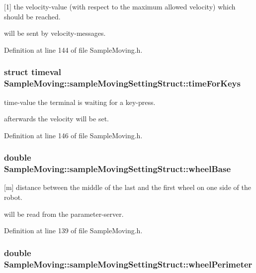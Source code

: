 \mbox{[}1\mbox{]} the velocity-\/value (with respect to the maximum allowed velocity) which should be reached. 

will be sent by velocity-\/messages. 

Definition at line 144 of file Sample\-Moving.\-h.

\hypertarget{structSampleMoving_1_1sampleMovingSettingStruct_a4d960897101facc5a4d0e0998d68728e}{
\subsubsection[{time\-For\-Keys}]{\setlength{\rightskip}{0pt plus 5cm}struct timeval Sample\-Moving\-::sample\-Moving\-Setting\-Struct\-::time\-For\-Keys}}\label{structSampleMoving_1_1sampleMovingSettingStruct_a4d960897101facc5a4d0e0998d68728e}


time-\/value the terminal is waiting for a key-\/press. 

afterwards the velocity will be set. 

Definition at line 146 of file Sample\-Moving.\-h.

\hypertarget{structSampleMoving_1_1sampleMovingSettingStruct_a9606973b8c9b90b8dc360855397505f9}{
\subsubsection[{wheel\-Base}]{\setlength{\rightskip}{0pt plus 5cm}double Sample\-Moving\-::sample\-Moving\-Setting\-Struct\-::wheel\-Base}}\label{structSampleMoving_1_1sampleMovingSettingStruct_a9606973b8c9b90b8dc360855397505f9}


\mbox{[}m\mbox{]} distance between the middle of the last and the first wheel on one side of the robot. 

will be read from the parameter-\/server. 

Definition at line 139 of file Sample\-Moving.\-h.

\hypertarget{structSampleMoving_1_1sampleMovingSettingStruct_a3c927853f6d6514e45fb40e0f4c0b783}{
\subsubsection[{wheel\-Perimeter}]{\setlength{\rightskip}{0pt plus 5cm}double Sample\-Moving\-::sample\-Moving\-Setting\-Struct\-::wheel\-Perimeter}}\label{structSampleMoving_1_1sampleMovingSettingStruct_a3c927853f6d6514e45fb40e0f4c0b783}


